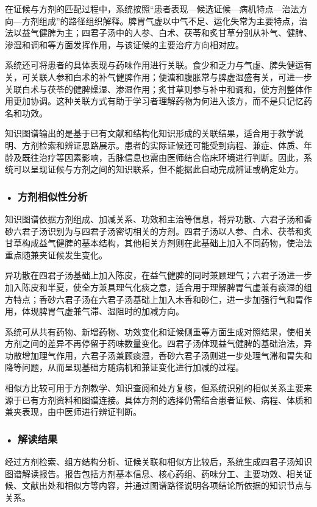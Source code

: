 在证候与方剂的匹配过程中，系统按照“患者表现—候选证候—病机特点—治法方向—方剂组成”的路径组织解释。脾胃气虚以中气不足、运化失常为主要特点，治法以益气健脾为主；四君子汤中的人参、白术、茯苓和炙甘草分别从补气、健脾、渗湿和调和等方面发挥作用，与该证候的主要治疗方向相对应。

系统还可将患者的具体表现与药味作用进行关联。食少和乏力与气虚、脾失健运有关，可关联人参和白术的补气健脾作用；便溏和腹胀常与脾虚湿盛有关，可进一步关联白术与茯苓的健脾燥湿、渗湿作用；炙甘草则参与补中和调和，使方剂整体作用更加协调。这种关联方式有助于学习者理解药物为何进入该方，而不是只记忆药名和功效。

知识图谱输出的是基于已有文献和结构化知识形成的关联结果，适合用于教学说明、方剂检索和辨证思路展示。患者的实际证候还可能受到病程、兼症、体质、年龄及既往治疗等因素影响，舌脉信息也需由医师结合临床环境进行判断。因此，系统可以呈现证候与方剂之间的知识联系，但不能据此自动完成辨证或确定处方。
\subsubsection*{\textbf{• 方剂相似性分析}}

知识图谱依据方剂组成、加减关系、功效和主治等信息，将异功散、六君子汤和香砂六君子汤识别为与四君子汤密切相关的方剂。四君子汤以人参、白术、茯苓和炙甘草构成益气健脾的基本结构，其他相关方剂则在此基础上加入不同药物，使治法重点随兼夹证候发生变化。

异功散在四君子汤基础上加入陈皮，在益气健脾的同时兼顾理气；六君子汤进一步加入陈皮和半夏，使全方兼具理气化痰之意，适合用于理解脾胃气虚兼有痰湿的组方特点；香砂六君子汤在六君子汤基础上加入木香和砂仁，进一步加强行气和胃作用，体现脾胃气虚兼气滞、湿阻时的加减方向。

系统可从共有药物、新增药物、功效变化和证候侧重等方面生成对照结果，使相关方剂之间的差异不再停留于药味数量变化。四君子汤体现益气健脾的基础治法，异功散增加理气作用，六君子汤兼顾痰湿，香砂六君子汤则进一步处理气滞和胃失和降等问题，从而呈现基础方随病机和兼证变化进行加减的过程。

相似方比较可用于方剂教学、知识查阅和处方复核，但系统识别的相似关系主要来源于已有方剂资料和图谱连接。具体方剂的选择仍需结合患者证候、病程、体质和兼夹表现，由中医师进行辨证判断。

\subsubsection*{\textbf{• 解读结果}}

经过方剂检索、组方结构分析、证候关联和相似方比较后，系统生成四君子汤知识图谱解读报告。报告包括方剂基本信息、核心药组、药味分工、主要功效、相关证候、文献出处和相似方等内容，并通过图谱路径说明各项结论所依据的知识节点与关系。

